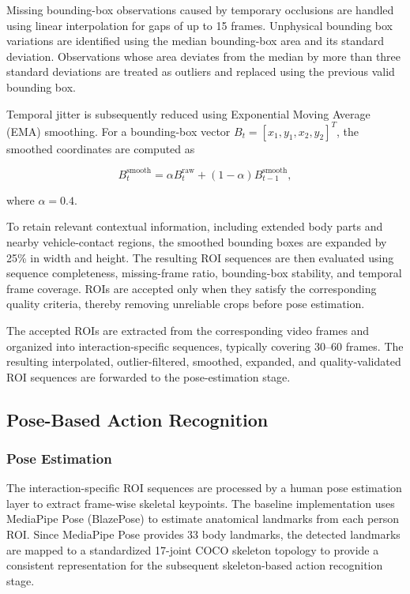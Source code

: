 \documentclass[runningheads]{llncs}
\begin{document}
Missing bounding-box observations caused by temporary occlusions are handled
using linear interpolation for gaps of up to 15 frames. Unphysical bounding
box variations are identified using the median bounding-box area and its
standard deviation. Observations whose area deviates from the median by more
than three standard deviations are treated as outliers and replaced using
the previous valid bounding box.

Temporal jitter is subsequently reduced using Exponential Moving Average
(EMA) smoothing. For a bounding-box vector
$B_t=[x_1,y_1,x_2,y_2]^T$, the smoothed coordinates are computed as

\begin{equation}
B_t^{\mathrm{smooth}}
=
\alpha B_t^{\mathrm{raw}}
+
(1-\alpha)B_{t-1}^{\mathrm{smooth}},
\end{equation}

where $\alpha=0.4$.

To retain relevant contextual information, including extended body parts
and nearby vehicle-contact regions, the smoothed bounding boxes are
expanded by 25\% in width and height. The resulting ROI sequences are then
evaluated using sequence completeness, missing-frame ratio, bounding-box
stability, and temporal frame coverage. ROIs are accepted only when they
satisfy the corresponding quality criteria, thereby removing unreliable
crops before pose estimation.

The accepted ROIs are extracted from the corresponding video frames and
organized into interaction-specific sequences, typically covering
30--60 frames. The resulting interpolated, outlier-filtered, smoothed,
expanded, and quality-validated ROI sequences are forwarded to the
pose-estimation stage.

\subsection{Pose-Based Action Recognition}
\subsubsection{Pose Estimation}

The interaction-specific ROI sequences are processed by a human pose
estimation layer to extract frame-wise skeletal keypoints. The baseline
implementation uses MediaPipe Pose (BlazePose) to estimate anatomical
landmarks from each person ROI. Since MediaPipe Pose provides 33 body
landmarks, the detected landmarks are mapped to a standardized
17-joint COCO skeleton topology to provide a consistent representation
for the subsequent skeleton-based action recognition stage.
\end{document}
